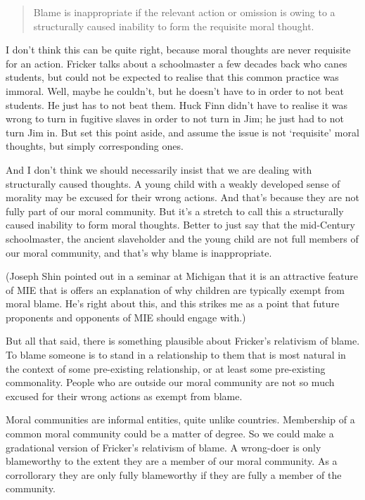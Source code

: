 \begin{quote}
Blame is inappropriate if the relevant action or omission is owing to a structurally caused inability to form the requisite moral thought. ~\citep[167]{Fricker2010}
\end{quote}
I don't think this can be quite right, because moral thoughts are never requisite for an action. Fricker talks about a schoolmaster a few decades back who canes students, but could not be expected to realise that this common practice was immoral. Well, maybe he couldn't, but he doesn't have to in order to not beat students. He just has to not beat them. \gls{Huck} Finn didn't have to realise it was wrong to turn in fugitive slaves in order to not turn in Jim; he just had to not turn Jim in. But set this point aside, and assume the issue is not `requisite' moral thoughts, but simply corresponding ones.

And I don't think we should necessarily insist that we are dealing with structurally caused thoughts. A young child with a weakly developed sense of morality may be excused for their wrong actions. And that's because they are not fully part of our moral community. But it's a stretch to call this a structurally caused inability to form moral thoughts. Better to just say that the mid-Century schoolmaster, the ancient slaveholder and the young child are not full members of our moral community, and that's why blame is inappropriate.

(Joseph Shin pointed out in a seminar at Michigan that it is an attractive feature of MIE that is offers an explanation of why children are typically exempt from moral blame. He's right about this, and this strikes me as a point that future proponents and opponents of MIE should engage with.)

But all that said, there is something plausible about Fricker's relativism of blame. To blame someone is to stand in a relationship to them that is most natural in the context of some pre-existing relationship, or at least some pre-existing commonality. People who are outside our moral community are not so much excused for their wrong actions as exempt from blame.

Moral communities are informal entities, quite unlike countries. Membership of a common moral community could be a matter of degree. So we could make a gradational version of Fricker's relativism of blame. A wrong-doer is only blameworthy to the extent they are a member of our moral community. As a corrollorary they are only fully blameworthy if they are fully a member of the community.

